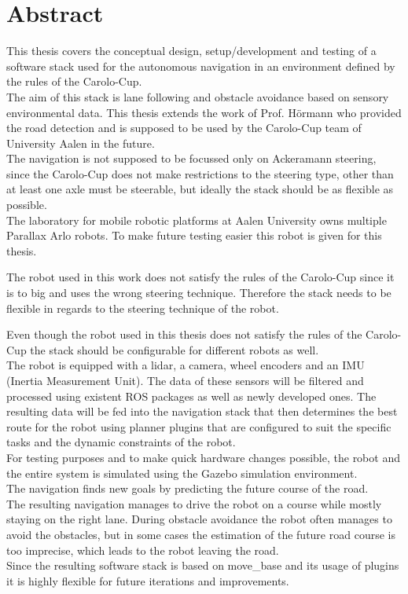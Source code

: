 \chapter*{Abstract}
\label{abstract}
This thesis covers the conceptual design, setup/development and testing of a software stack used for the autonomous navigation in an environment defined by the rules of the Carolo-Cup.\\

 The aim of this stack is lane following and obstacle avoidance based on sensory environmental data. This thesis extends the work of Prof. Hörmann who provided the road detection and is supposed to be used by the Carolo-Cup team of University Aalen in the future.\\
 
 The navigation is not supposed to be focussed only on Ackeramann steering, since the Carolo-Cup does not make restrictions to the steering type, other than at least one axle must be steerable, but ideally the stack should be as flexible as possible\cite{carolocup}.\\
 The laboratory for mobile robotic platforms at Aalen University owns multiple Parallax Arlo robots. To make future testing easier this robot is given for this thesis.

 The robot used in this work does not satisfy the rules of the Carolo-Cup since it is to big and uses the wrong steering technique. Therefore the stack needs to be flexible in regards to the steering technique of the robot.
 
 Even though the robot used in this thesis does not satisfy the rules of the Carolo-Cup the stack should be configurable for different robots as well.\\

The robot is equipped with a lidar, a camera, wheel encoders and an IMU (Inertia Measurement Unit). The data of these sensors will be filtered and processed using existent ROS packages as well as newly developed ones. The resulting data will be fed into the navigation stack that then determines the best route for the robot using planner plugins that are configured to suit the specific tasks and the dynamic constraints of the robot.\\

For testing purposes and to make quick hardware changes possible, the robot and the entire system is simulated using the Gazebo simulation environment.\\

The navigation finds new goals by predicting the future course of the road.\\

The resulting navigation manages to drive the robot on a course while mostly staying on the right lane. During obstacle avoidance the robot often manages to avoid the obstacles, but in some cases the estimation of the future road course is too imprecise, which leads to the robot leaving the road.\\

Since the resulting software stack is based on move\_base and its usage of plugins it is highly flexible for future iterations and improvements.\\